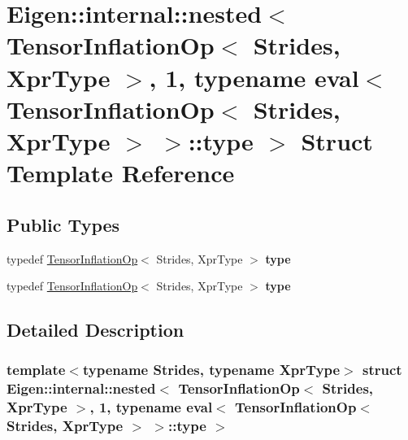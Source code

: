 \hypertarget{struct_eigen_1_1internal_1_1nested_3_01_tensor_inflation_op_3_01_strides_00_01_xpr_type_01_4_00_eeee4fbc81465d4717490c737a712fae}{}\section{Eigen\+:\+:internal\+:\+:nested$<$ Tensor\+Inflation\+Op$<$ Strides, Xpr\+Type $>$, 1, typename eval$<$ Tensor\+Inflation\+Op$<$ Strides, Xpr\+Type $>$ $>$\+:\+:type $>$ Struct Template Reference}
\label{struct_eigen_1_1internal_1_1nested_3_01_tensor_inflation_op_3_01_strides_00_01_xpr_type_01_4_00_eeee4fbc81465d4717490c737a712fae}
\subsection*{Public Types}
\begin{DoxyCompactItemize}
\item 
\mbox{\label{struct_eigen_1_1internal_1_1nested_3_01_tensor_inflation_op_3_01_strides_00_01_xpr_type_01_4_00_eeee4fbc81465d4717490c737a712fae_a229f10591098a7bd776743bede731f5f}} 
typedef \hyperlink{class_eigen_1_1_tensor_inflation_op}{Tensor\+Inflation\+Op}$<$ Strides, Xpr\+Type $>$ {\bfseries type}
\item 
\mbox{\label{struct_eigen_1_1internal_1_1nested_3_01_tensor_inflation_op_3_01_strides_00_01_xpr_type_01_4_00_eeee4fbc81465d4717490c737a712fae_a229f10591098a7bd776743bede731f5f}} 
typedef \hyperlink{class_eigen_1_1_tensor_inflation_op}{Tensor\+Inflation\+Op}$<$ Strides, Xpr\+Type $>$ {\bfseries type}
\end{DoxyCompactItemize}


\subsection{Detailed Description}
\subsubsection*{template$<$typename Strides, typename Xpr\+Type$>$\newline
struct Eigen\+::internal\+::nested$<$ Tensor\+Inflation\+Op$<$ Strides, Xpr\+Type $>$, 1, typename eval$<$ Tensor\+Inflation\+Op$<$ Strides, Xpr\+Type $>$ $>$\+::type $>$}



